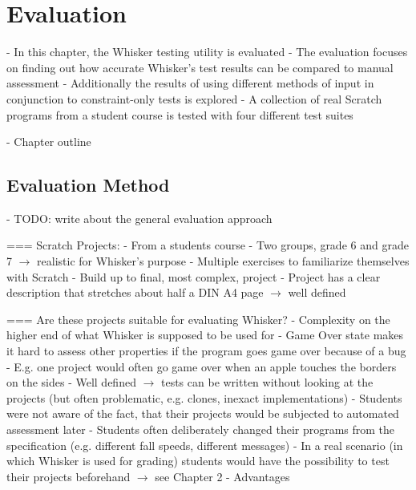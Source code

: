 \chapter{Evaluation}

- In this chapter, the Whisker testing utility is evaluated
- The evaluation focuses on finding out how accurate Whisker's test results can be compared to manual assessment
- Additionally the results of using different methods of input in conjunction to constraint-only tests is explored
- A collection of real Scratch programs from a student course is tested with four different test suites

- Chapter outline

\section{Evaluation Method}

- TODO: write about the general evaluation approach

=== Scratch Projects:
- From a students course
- Two groups, grade 6 and grade 7 $\rightarrow$ realistic for Whisker's purpose
- Multiple exercises to familiarize themselves with Scratch
- Build up to final, most complex, project
- Project has a clear description that stretches about half a DIN A4 page $\rightarrow$ well defined

=== Are these projects suitable for evaluating Whisker?
- Complexity on the higher end of what Whisker is supposed to be used for
- Game Over state makes it hard to assess other properties if the program goes game over because of a bug
    - E.g. one project would often go game over when an apple touches the borders on the sides
    - Well defined $\rightarrow$ tests can be written without looking at the projects (but often problematic, e.g. clones, inexact implementations)
- Students were not aware of the fact, that their projects would be subjected to automated assessment later
    - Students often deliberately changed their programs from the specification (e.g. different fall speeds, different messages)
    - In a real scenario (in which Whisker is used for grading) students would have the possibility to test their projects beforehand
    $\rightarrow$ see Chapter 2 - Advantages

